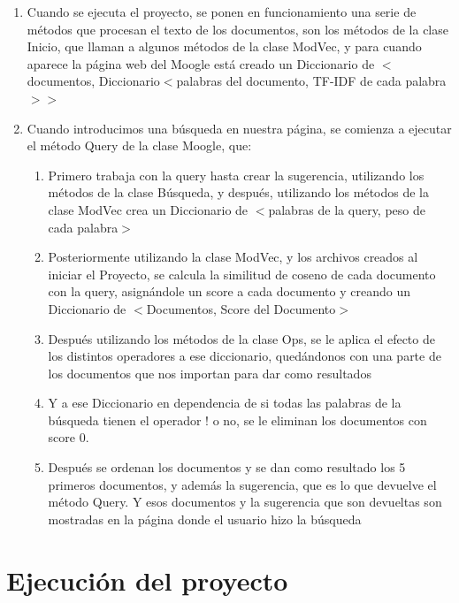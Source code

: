\documentclass[12pt, a4paper]{article}
\begin{document}
\begin{enumerate}
      \item Cuando se ejecuta el proyecto, se ponen en funcionamiento una serie de métodos que procesan el texto de los documentos, son los métodos de la clase Inicio, que llaman a algunos métodos de la clase ModVec, y para cuando aparece la página web del Moogle está creado un Diccionario de
            $<$documentos, Diccionario$<$palabras del documento, TF-IDF de cada palabra$>>$
      \item Cuando introducimos una búsqueda en nuestra página, se comienza a ejecutar el método Query de la clase Moogle, que:
            \begin{enumerate}
                  \item Primero trabaja con la query hasta crear la sugerencia, utilizando los métodos de la clase
                        Búsqueda, y después, utilizando los métodos de la clase ModVec crea un Diccionario de
                        $<$palabras de la query, peso de cada palabra$>$
                  \item Posteriormente utilizando la clase ModVec, y los archivos creados al iniciar el Proyecto, se calcula la similitud de coseno de cada documento con la query, asignándole un score a cada documento y creando un Diccionario de
                        $<$Documentos, Score del Documento$>$
                  \item Después utilizando los métodos de la clase Ops, se le aplica el efecto de los distintos operadores a ese diccionario, quedándonos con una parte de los documentos que nos importan para dar como resultados
                  \item Y a ese Diccionario en dependencia de si todas las palabras de la búsqueda tienen el operador ! o no, se le eliminan los documentos con score 0.
                  \item Después se ordenan los documentos y se dan como resultado los 5 primeros documentos, y además la sugerencia, que es lo que devuelve el método Query.
                        Y esos documentos y la sugerencia que son devueltas son mostradas en la página donde el usuario hizo la búsqueda
            \end{enumerate}

\end{enumerate}

\section{Ejecución del proyecto}
\end{document}
